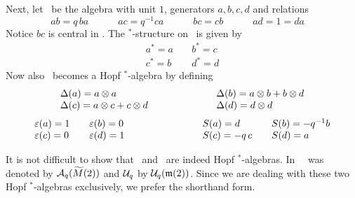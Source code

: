 Next, let \Uq\ be the algebra with unit $1$, generators $a,b,c,d$
and relations
\begin{equation}\label{eq:relations:Uq}
   ab = q \,ba   \hspace{3em}
   ac = q^{-1}ca \hspace{3em}
   bc = cb       \hspace{3em}
   ad = 1 = da   \hspace{1em}
\end{equation}
Notice $bc$ is central in \Uq\@. The $^*$-structure on \Uq\ is
given by
$$ \begin{array}{lcl}
     a^* = a  & \; & b^* = c \\
     c^* = b  &    & d^* = d
   \end{array} $$
Now also \Uq\ becomes a Hopf $^*$-algebra by defining
$$ \begin{array}{lcl}
  \Delta(a) = a \otimes a  &\hspace{5em} & \Delta(b) = a \otimes b + b \otimes d \\
  \Delta(c) = a \otimes c + c \otimes d   &  & \Delta(d) = d \otimes d
  \end{array}  $$
$$ \begin{array}{lclclcl}
  \varepsilon(a) = 1 & &  \varepsilon(b) = 0 & \hspace{6em} & S(a) = d & & S(b) = -q^{-1}b \\
  \varepsilon(c) = 0 & &  \varepsilon(d) = 1 &  & S(c) = -q\,c & & S(d) = a
\end{array} $$

It is not difficult to show that \Aq\ and \Uq\ are indeed
Hopf $^*$-algebras. In \cite{Koelink:thesis,Koelink:QE2}\ \Aq\ was
denoted by ${\mathcal A}_q(\widetilde{M}(2))$ and ${\mathcal U}_q$ by ${\mathcal U}_q(\mathfrak{m}(2))$. Since
we are dealing with these two Hopf $^*$-algebras
exclusively, we prefer the shorthand form.


